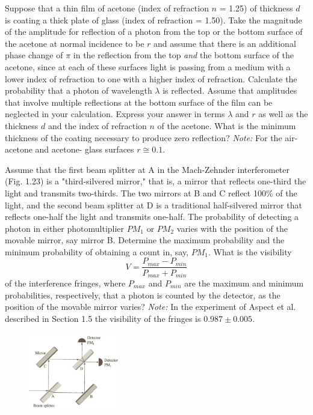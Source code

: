 \documentclass[11pt,letterpaper,boxed,noheader]{pset}
\begin{document}
    \begin{problem} [*T1.25]
        Suppose that a thin film of acetone (index of refraction $n$ = 1.25) of thickness $d$ is coating a thick plate of glass (index of refraction = 1.50). Take the magnitude of the amplitude for reflection of a photon from the top or the bottom surface of the acetone at normal incidence to be $r$ and assume that there is an additional phase change of $\pi$ in the reflection from the top \textit{and} the bottom surface of the acetone, since at each of these surfaces light is passing from a medium with a lower index of refraction to one with a higher index of refraction. Calculate the probability that a photon of wavelength $\lambda$ is reflected. Assume that amplitudes that involve multiple reflections at the bottom surface of the film can be neglected in your calculation. Express your answer in terms $\lambda$ and $r$ as well as the thickness $d$ and the index of refraction $n$ of the acetone. What is the minimum thickness of the coating necessary to produce zero reflection? \textit{Note:} For the air-acetone and acetone- glass surfaces $r \cong 0.1$.
    \end{problem}
    \newpage
    
    \begin{problem} [T1.26]
        Assume that the first beam splitter at A in the Mach-Zehnder interferometer (Fig. 1.23) is a "third-silvered mirror," that is, a mirror that reflects one-third the light and transmits two-thirds. The two mirrors at B and C reflect 100\% of the light, and the second beam splitter at D is a traditional half-silvered mirror that reflects one-half the light and transmits one-half. The probability of detecting a photon in either photomultiplier $PM_1$ or $PM_2$ varies with the position of the movable mirror, say mirror B. Determine the maximum probability and the minimum probability of obtaining a count in, say, $PM_1$. What is the visibility
        \[V = \frac{P_{max}-P_{min}}{P_{max}+P_{min}}\]
        of the interference fringes, where $P_{max}$ and $P_{min}$ are the maximum and minimum probabilities, respectively, that a photon is counted by the detector, as the position of the movable mirror varies? \textit{Note:} In the experiment of Aspect et al. described in Section 1.5 the visibility of the fringes is $0.987 \pm 0.005$.
    \end{problem}
    
    \begin{figure} [ht]
        \includegraphics[width=150px]{HW14Images/T1-26.png}
    \end{figure}
    \newpage
    
\end{document}
